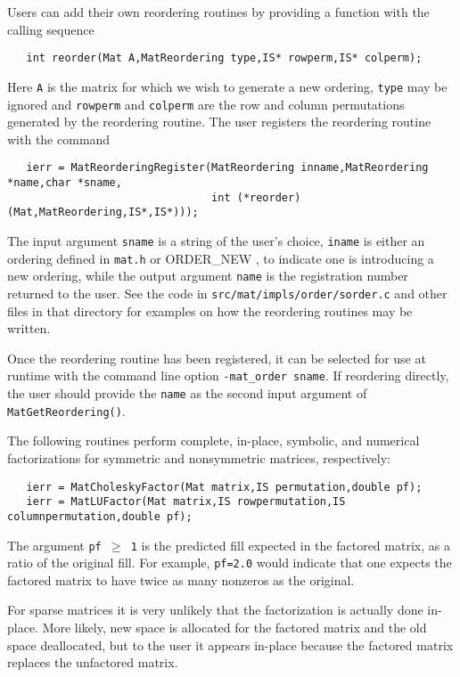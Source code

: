 Users can add their own reordering routines 
by providing a function with the calling sequence
\begin{verbatim}
   int reorder(Mat A,MatReordering type,IS* rowperm,IS* colperm);
\end{verbatim}
Here {\tt A} is the matrix for which we wish to generate a new ordering, 
{\tt type} may be ignored and {\tt rowperm} and {\tt colperm} are the row
and column permutations generated by the reordering routine.
The user registers the reordering routine
with the command
\begin{verbatim}
   ierr = MatReorderingRegister(MatReordering inname,MatReordering *name,char *sname,
                                int (*reorder)(Mat,MatReordering,IS*,IS*)));
\end{verbatim}
The   
input argument {\tt *sname} is a string of the user's choice, {\tt iname} is either 
an ordering defined in {\tt mat.h} or {ORDER\_NEW} ,
to indicate one is introducing a new ordering, while the output
argument {\tt *name} is the registration number returned to the user.
See the code in {\tt src/mat/impls/order/sorder.c} and other files in that 
directory for examples on how the reordering routines may be written.

Once the reordering routine has been registered,
it can be selected for use at runtime with the
command line option {\tt -mat\_order sname}.  If reordering directly,
the user should provide the {\tt name} as the second input argument of
{\tt MatGetReordering()}.

The following routines perform complete, in-place, symbolic, and numerical 
factorizations for symmetric and nonsymmetric matrices, respectively:
\begin{verbatim}
   ierr = MatCholeskyFactor(Mat matrix,IS permutation,double pf);
   ierr = MatLUFactor(Mat matrix,IS rowpermutation,IS columnpermutation,double pf); 
\end{verbatim}
The argument {\tt pf $ \ge $ 1} is the predicted fill
expected in the factored matrix, as a ratio of the original fill. 
For example, {\tt pf=2.0} would indicate that one expects the factored
matrix to have twice as many nonzeros as the original.
 

For sparse matrices it is very unlikely that the factorization 
is actually done in-place. More likely, new space is allocated 
for the factored matrix and the old space deallocated, but to the 
user it appears in-place because the factored matrix replaces
the unfactored matrix.

